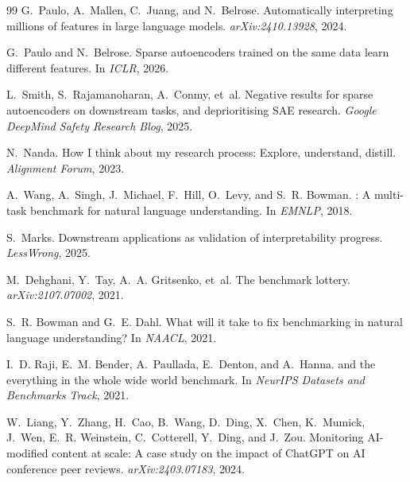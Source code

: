 \documentclass{article}
\begin{document}
\begin{thebibliography}{99}
G.~Paulo, A.~Mallen, C.~Juang, and N.~Belrose.
\newblock Automatically interpreting millions of features in large language models.
\newblock \emph{arXiv:2410.13928}, 2024.

G.~Paulo and N.~Belrose.
\newblock Sparse autoencoders trained on the same data learn different features.
\newblock In \emph{ICLR}, 2026.

L.~Smith, S.~Rajamanoharan, A.~Conmy, et~al.
\newblock Negative results for sparse autoencoders on downstream tasks, and deprioritising {SAE} research.
\newblock \emph{Google DeepMind Safety Research Blog}, 2025.

N.~Nanda.
\newblock How {I} think about my research process: Explore, understand, distill.
\newblock \emph{Alignment Forum}, 2023.

A.~Wang, A.~Singh, J.~Michael, F.~Hill, O.~Levy, and S.~R. Bowman.
: A multi-task benchmark for natural language understanding.
\newblock In \emph{EMNLP}, 2018.

S.~Marks.
\newblock Downstream applications as validation of interpretability progress.
\newblock \emph{LessWrong}, 2025.

M.~Dehghani, Y.~Tay, A.~A. Gritsenko, et~al.
\newblock The benchmark lottery.
\newblock \emph{arXiv:2107.07002}, 2021.

S.~R. Bowman and G.~E. Dahl.
\newblock What will it take to fix benchmarking in natural language understanding?
\newblock In \emph{NAACL}, 2021.

I.~D. Raji, E.~M. Bender, A.~Paullada, E.~Denton, and A.~Hanna.
 and the everything in the whole wide world benchmark.
\newblock In \emph{NeurIPS Datasets and Benchmarks Track}, 2021.

W.~Liang, Y.~Zhang, H.~Cao, B.~Wang, D.~Ding, X.~Chen, K.~Mumick, J.~Wen, E.~R. Weinstein, C.~Cotterell, Y.~Ding, and J.~Zou.
\newblock Monitoring {AI}-modified content at scale: A case study on the impact of {ChatGPT} on {AI} conference peer reviews.
\newblock \emph{arXiv:2403.07183}, 2024.


\end{thebibliography}
\end{document}
